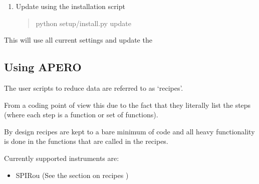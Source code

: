 \documentclass[a4paper,10pt,english]{report}
\begin{document}
\begin{enumerate}
\begin{quote}
or if you have it aliased

\begin{sphinxVerbatim}[commandchars=\\\{\}]
setup\PYGZus{}njc\PYGZus{}200903
\end{sphinxVerbatim}
\end{quote}

\item {} 
Update using the installation script
\begin{quote}

\begin{sphinxVerbatim}[commandchars=\\\{\}]
python setup/install.py \PYGZhy{}\PYGZhy{}update
\end{sphinxVerbatim}
\end{quote}

\end{enumerate}

This will use all current settings and update the


\subsection{Using APERO}
\label{\detokenize{user/general/using_apero_default:using-apero}}\label{\detokenize{user/general/using_apero_default:using-apero-default}}\label{\detokenize{user/general/using_apero_default::doc}}
The user scripts to reduce data are referred to as ‘recipes’.

From a coding point of view this due to the fact that they literally list
the steps (where each step is a function or set of functions).

By design recipes are kept to a bare minimum of code and all heavy functionality
is done in the functions that are called in the recipes.

Currently supported instruments are:
\begin{itemize}
\item {} 
SPIRou (See the section on recipes {\hyperref[\detokenize{user/spirou/recipes_spirou:recipes-spirou}]{}})

\end{itemize}
\end{document}
